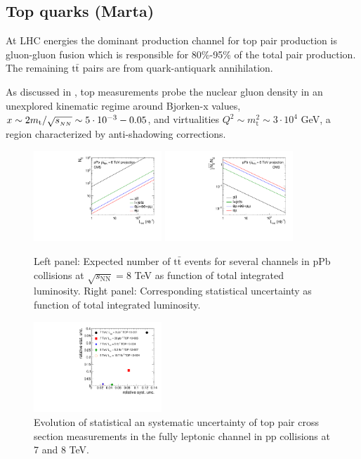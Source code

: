\subsection{Top quarks (Marta)}
At LHC energies the dominant production channel for top pair production is gluon-gluon fusion which is responsible for 80\%-95\% of the total pair production. The remaining $\mathrm{t}\bar{\mathrm{t}}$ pairs are from quark-antiquark annihilation. 

As discussed in \cite{d'Enterria:2015jna}, top measurements probe the nuclear gluon density in an unexplored kinematic regime around Bjorken-x values, $x \sim 2m_{\mathrm{t}}/\sqrt{s_{_{NN}}} \sim 5 \cdot 10^{-3}-0.05$, and virtualities $Q^{2} \sim m_{\mathrm{t}}^{2} \sim 3 \cdot 10^{4}$ GeV, a region characterized by anti-shadowing corrections. 

\begin{figure}[h]
\begin{center}
  \includegraphics[width= 0.43\textwidth]{figures/top/ProjectedTTbarYield.pdf}
  \includegraphics[width= 0.43\textwidth]{figures/top/ProjectedTTbarStatUnc.pdf}
  \caption{Left panel: Expected number of $\mathrm{t}\bar{\mathrm{t}}$ events for several channels in pPb collisions at $\sqrt{s_{\mathrm{NN}}}=8$ TeV as function of total integrated luminosity. Right panel: Corresponding statistical uncertainty as function of total integrated luminosity.
  }
\label{fig:ttPPbProjections}
\end{center}
\end{figure}

\begin{figure}[h]
\begin{center}
  \includegraphics[width= 0.43\textwidth]{figures/top/topToLLXSecUncertaintiesPP.pdf}
  \caption{Evolution of statistical an systematic uncertainty of top pair cross section measurements in the fully leptonic channel in pp collisions at 7 and 8 TeV.
  }
\label{fig:ttStatSyst}
\end{center}
\end{figure}
